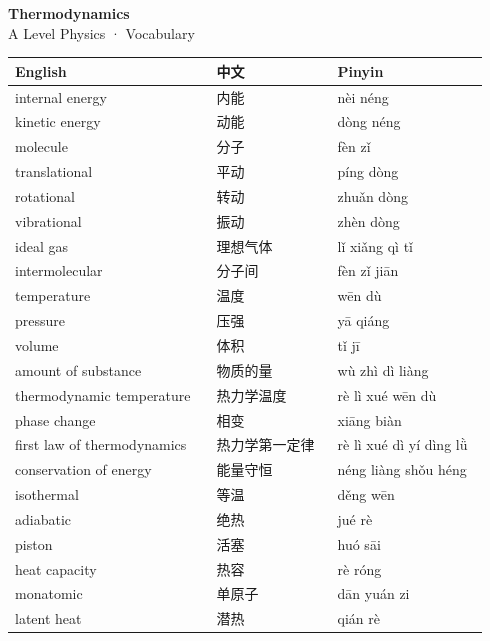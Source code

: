 \documentclass[11pt]{article}
\begin{document}
\begin{center}
  {\LARGE\bfseries Thermodynamics}\\[0.35em]
  {\large A Level Physics · Vocabulary}
\end{center}
\vspace{0.6em}

\begin{longtable}{@{}p{0.40\linewidth}p{0.24\linewidth}p{0.30\linewidth}@{}}
\toprule
\textbf{English} & \textbf{中文} & \textbf{Pinyin} \\
\midrule
\endhead
\bottomrule
\endlastfoot
internal energy & 内能 & nèi néng \\
kinetic energy & 动能 & dòng néng \\
molecule & 分子 & fèn zǐ \\
translational & 平动 & píng dòng \\
rotational & 转动 & zhuǎn dòng \\
vibrational & 振动 & zhèn dòng \\
ideal gas & 理想气体 & lǐ xiǎng qì tǐ \\
intermolecular & 分子间 & fèn zǐ jiān \\
temperature & 温度 & wēn dù \\
pressure & 压强 & yā qiáng \\
volume & 体积 & tǐ jī \\
amount of substance & 物质的量 & wù zhì dì liàng \\
thermodynamic temperature & 热力学温度 & rè lì xué wēn dù \\
phase change & 相变 & xiāng biàn \\
first law of thermodynamics & 热力学第一定律 & rè lì xué dì yí dìng lǜ \\
conservation of energy & 能量守恒 & néng liàng shǒu héng \\
isothermal & 等温 & děng wēn \\
adiabatic & 绝热 & jué rè \\
piston & 活塞 & huó sāi \\
heat capacity & 热容 & rè róng \\
monatomic & 单原子 & dān yuán zi \\
latent heat & 潜热 & qián rè \\
\end{longtable}
\end{document}
